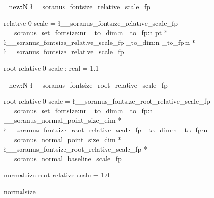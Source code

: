 \fp_new:N \l__soranus_fontsize_relative_scale_fp

 { relative } { 0 }
  {
    scale = \l__soranus_fontsize_relative_scale_fp
  }
  {
    \AssignTemplateKeys
    \__soranus_set_fontsize:nn
      {
        \fp_to_dim:n
          {
            \dim_to_fp:n { \f@size pt }
            * \l__soranus_fontsize_relative_scale_fp
          }
      }
      {
        \fp_to_dim:n
          {
            \dim_to_fp:n { \f@baselineskip }
            * \l__soranus_fontsize_relative_scale_fp
          }
      }
  }


%

 { root-relative } { 0 }
  {
    scale : real = 1.1
  }


\fp_new:N \l__soranus_fontsize_root_relative_scale_fp

 { root-relative } { 0 }
  {
    scale = \l__soranus_fontsize_root_relative_scale_fp
  }
  {
    \AssignTemplateKeys
    \__soranus_set_fontsize:nn
      {
        \fp_to_dim:n
          {
            \dim_to_fp:n { \g__soranus_normal_point_size_dim }
            * \l__soranus_fontsize_root_relative_scale_fp
          }
      }
      {
        \fp_to_dim:n
          {
            \dim_to_fp:n { \g__soranus_normal_point_size_dim }
            * \l__soranus_fontsize_root_relative_scale_fp
            * \g__soranus_normal_baseline_scale_fp
          }
      }
  }


%

 { normalsize } { root-relative }
  {
    scale = 1.0
  }

\RenewDocumentCommand \normalsize { }
  {  { normalsize } }

